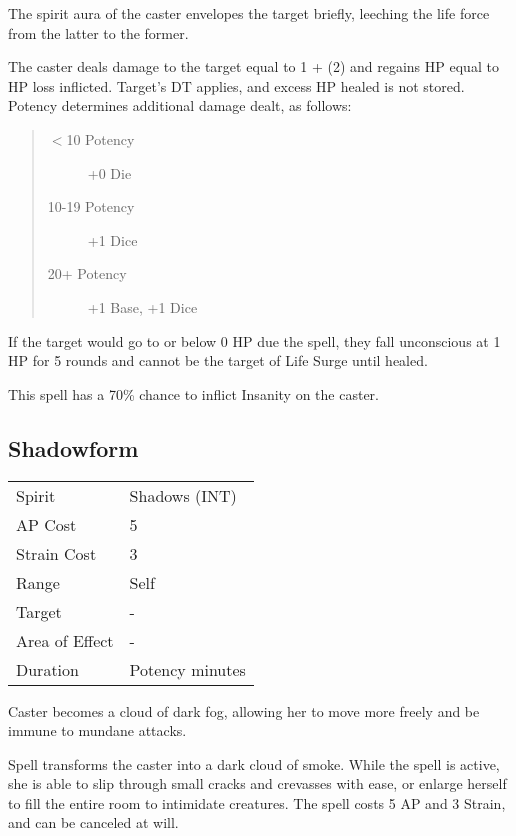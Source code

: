 \documentclass[11pt,a4paper,twocolumn]{book}
\begin{document}
The spirit aura of the caster envelopes the target briefly, leeching the life force from the latter to the former.

The caster deals damage to the target equal to 1 + (2) and regains HP equal to HP loss inflicted. Target's DT applies, and excess HP healed is not stored. Potency determines additional damage dealt, as follows:

\begin{quote}
	\begin{description}
		\item[$<$10 Potency] 	+0 Die
		\item[10-19 Potency] 	+1 Dice
		\item[20+ Potency] 		+1 Base, +1 Dice
	\end{description}	
\end{quote}

If the target would go to or below 0 HP due the spell, they fall unconscious at 1 HP for 5 rounds and cannot be the target of Life Surge until healed.

This spell has a 70\% chance to inflict Insanity on the caster.


\subsection*{Shadowform}

{
	\begin{tabu} to 75mm{| X[l,4] | X[l,7] |}
		\hline
		Spirit 			& Shadows (INT) 		\\
		AP Cost	      	& 5 					\\
		Strain Cost     & 3 					\\
		Range     		& Self					\\
		Target      	& -						\\
		Area of Effect  & -  	 				\\
		Duration     	& Potency minutes		\\ \hline
	\end{tabu}
	
}

\medskip

Caster becomes a cloud of dark fog, allowing her to move more freely and be immune to mundane attacks. 	

Spell transforms the caster into a dark cloud of smoke. While the spell is active, she is able to slip through small cracks and crevasses with ease, or enlarge herself to fill the entire room to intimidate creatures. The spell costs 5 AP and 3 Strain, and can be canceled at will.
\end{document}

